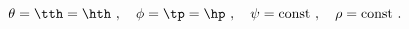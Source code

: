 \begin{equation}
\label{D5cond}
  \theta = \tth=\hth~,\quad \phi =\tp=\hp~,\quad 
  \psi=\text{const}~,\quad \rho=\text{const}~.
\end{equation}

